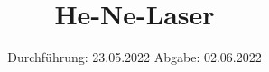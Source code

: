 

\subject{V61}
\title{He-Ne-Laser}
\date{%
  Durchführung: 23.05.2022
  \hspace{3em}
  Abgabe: 02.06.2022
}



\maketitle
\thispagestyle{empty}
\tableofcontents
\newpage






\printbibliography{}



